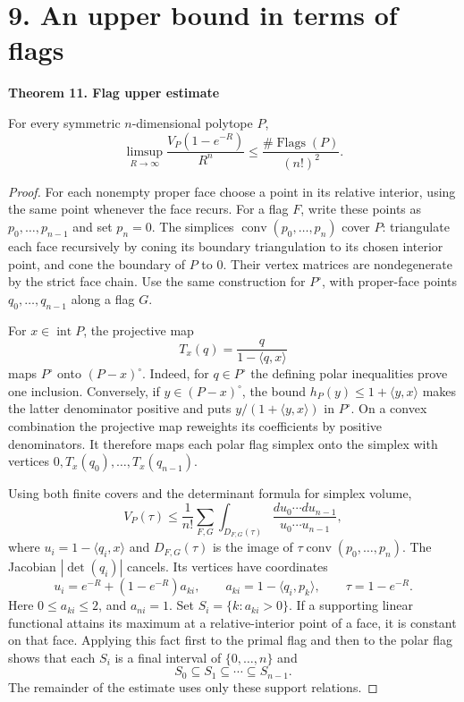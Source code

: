 \documentclass[11pt,a4paper]{article}
\newenvironment{statement}[1]{\begin{tcolorbox}[proofbox]\textbf{#1}\par\smallskip}{\end{tcolorbox}}
\newcommand{\conv}{\operatorname{conv}}
\newcommand{\intr}{\operatorname{int}}
\newcommand{\Flags}{\operatorname{Flags}}
\newcommand{\pair}[2]{\langle #1,#2\rangle}
\newcommand{\sect}[1]{\section*{#1}}
\begin{document}
\newpage
\sect{9. An upper bound in terms of flags}
\begin{statement}{Theorem 11. Flag upper estimate}
For every symmetric $n$-dimensional polytope $P$,
\begin{equation}\label{flagupper}
 \limsup_{R\to\infty}\frac{V_P(1-e^{-R})}{R^n}
 \leq\frac{\#\Flags(P)}{(n!)^2}.
\end{equation}
\end{statement}
\begin{proof}
For each nonempty proper face choose a point in its relative interior,
using the same point whenever the face recurs. For a flag $F$, write
these points as $p_0,\ldots,p_{n-1}$ and set $p_n=0$.
The simplices $\conv(p_0,\ldots,p_n)$ cover $P$: triangulate each face
recursively by coning its boundary triangulation to its chosen interior
point, and cone the boundary of $P$ to $0$. Their vertex matrices are
nondegenerate by the strict face chain. Use the same construction for
$P^\circ$, with proper-face points $q_0,\ldots,q_{n-1}$ along a flag $G$.

For $x\in\intr P$, the projective map
\[
 T_x(q)=\frac{q}{1-\pair qx}
\]
maps $P^\circ$ onto $(P-x)^\circ$. Indeed, for $q\in P^\circ$ the
defining polar inequalities prove one inclusion. Conversely, if
$y\in(P-x)^\circ$, the bound $h_P(y)\leq1+\pair yx$ makes the latter
denominator positive and puts $y/(1+\pair yx)$ in $P^\circ$.
On a convex combination the projective map reweights its coefficients
by positive denominators. It therefore maps each polar flag simplex
onto the simplex with vertices $0,T_x(q_0),\ldots,T_x(q_{n-1})$.

Using both finite covers and the determinant formula for simplex volume,
\[
 V_P(\tau)\leq\frac1{n!}\sum_{F,G}
 \int_{D_{F,G}(\tau)}\frac{du_0\cdots du_{n-1}}{u_0\cdots u_{n-1}},
\]
where $u_i=1-\pair{q_i}x$ and $D_{F,G}(\tau)$ is the image of
$\tau\conv(p_0,\ldots,p_n)$. The Jacobian $|\det(q_i)|$ cancels.
Its vertices have coordinates
\[
 u_i=e^{-R}+(1-e^{-R})a_{ki},\qquad
 a_{ki}=1-\pair{q_i}{p_k},\qquad\tau=1-e^{-R}.
\]
Here $0\leq a_{ki}\leq2$, and $a_{ni}=1$. Set
$S_i=\{k:a_{ki}>0\}$. If a supporting linear functional attains its
maximum at a relative-interior point of a face, it is constant on that
face. Applying this fact first to the primal flag and then to the polar
flag shows that each $S_i$ is a final interval of $\{0,\ldots,n\}$ and
\[
 S_0\subseteq S_1\subseteq\cdots\subseteq S_{n-1}.
\]
The remainder of the estimate uses only these support relations.
\renewcommand{\qedsymbol}{}
\end{proof}
\end{document}

